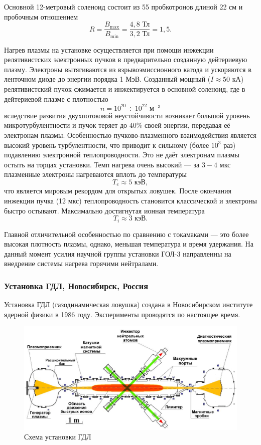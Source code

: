 Основной 12-метровый соленоид состоит из 55 пробкотронов длиной 22 см и пробочным отношением
\[
R = \frac{B_{\max}}{B_{\min}} = \frac{4,8 \text{ Тл}}{3,2 \text{ Тл}} = 1,5.
\]

Нагрев плазмы на установке осуществляется при помощи инжекции релятивистских электронных пучков в предварительно созданную дейтериевую плазму. Электроны   вытягиваются из взрывоэмиссионного катода и ускоряются в ленточном диоде до энергии порядка 1 МэВ. Созданный мощный ($I \approx 50$ кА) релятивистский пучок сжимается и инжектируется в основной соленоид, где в дейтериевой плазме с плотностью 
\[
n = 10^{20} \div 10^{22} \text{ м}^{-3}
\]
вследствие развития двухпотоковой неустойчивости возникает большой уровень микротурбулентности и пучок теряет до $40\%$ своей энергии, передавая её электронам плазмы. Особенностью пучково-плазменного взаимодействия является высокий уровень турбулентности, что приводит к сильному (более $10^3$ раз) подавлению электронной теплопроводности. Это не даёт электронам плазмы остыть на торцах установки. Темп нагрева очень высокий --- за $3 - 4$ мкс плазменные электроны нагреваются вплоть до температуры 
\[
T_e \approx 5 \text{ кэВ},
\]
что является мировым рекордом для открытых ловушек. После окончания инжекции пучка (12 мкс) теплопроводность становится классической и электроны быстро остывают. Максимально достигнутая ионная температура \cite{gol3_prog}
\[
T_i \approx 3 \text{ кэВ}.
\]


Главной отличительной особенностью по сравнению с токамаками --- это более высокая плотность плазмы, однако, меньшая температура и время удержания. На данный момент усилия научной группы установки ГОЛ-3 направленны на внедрение системы нагрева горячими нейтралами.


\subsubsection{Установка ГДЛ, Новосибирск, Россия}


Установка ГДЛ (газодинамическая ловушка) создана в Новосибирском институте ядерной физики в 1986 году.  Эксперименты проводятся по настоящее время.


\begin{figure}[h]
\centering
\includegraphics[width=0.95\linewidth]{../fig/ch1/GDL1}
\caption{Схема установки ГДЛ}
\label{fig:GDL1}
\end{figure}

